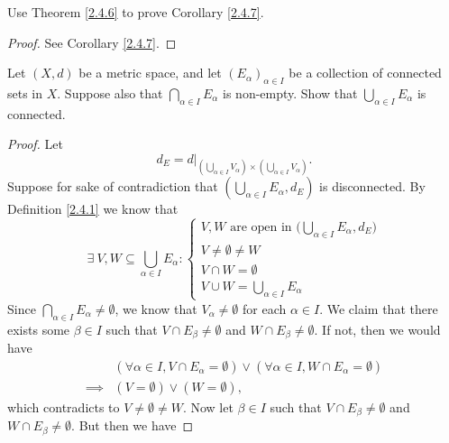 \begin{exercise}\label{ex 2.4.5}
    Use Theorem \ref{2.4.6} to prove Corollary \ref{2.4.7}.
\end{exercise}

\begin{proof}
    See Corollary \ref{2.4.7}.
\end{proof}

\begin{exercise}\label{ex 2.4.6}
    Let \((X, d)\) be a metric space, and let \((E_\alpha)_{\alpha \in I}\) be a collection of connected sets in \(X\).
    Suppose also that \(\bigcap_{\alpha \in I} E_\alpha\) is non-empty.
    Show that \(\bigcup_{\alpha \in I} E_\alpha\) is connected.
\end{exercise}

\begin{proof}
    Let
    \[
        d_E = d|_{(\bigcup_{\alpha \in I} V_\alpha) \times (\bigcup_{\alpha \in I} V_\alpha)}.
    \]
    Suppose for sake of contradiction that \((\bigcup_{\alpha \in I} E_\alpha, d_E)\) is disconnected.
    By Definition \ref{2.4.1} we know that
    \[
        \exists\ V, W \subseteq \bigcup_{\alpha \in I} E_\alpha : \begin{cases}
            V, W \text{ are open in } \bigg(\bigcup_{\alpha \in I} E_\alpha, d_E\bigg) \\
            V \neq \emptyset \neq W                                                    \\
            V \cap W = \emptyset                                                       \\
            V \cup W = \bigcup_{\alpha \in I} E_\alpha
        \end{cases}
    \]
    Since \(\bigcap_{\alpha \in I} E_\alpha \neq \emptyset\), we know that \(V_\alpha \neq \emptyset\) for each \(\alpha \in I\).
    We claim that there exists some \(\beta \in I\) such that \(V \cap E_\beta \neq \emptyset\) and \(W \cap E_\beta \neq \emptyset\).
    If not, then we would have
    \begin{align*}
                 & (\forall \alpha \in I, V \cap E_\alpha = \emptyset) \lor (\forall \alpha \in I, W \cap E_\alpha = \emptyset) \\
        \implies & (V = \emptyset) \lor (W = \emptyset),
    \end{align*}
    which contradicts to \(V \neq \emptyset \neq W\).
    Now let \(\beta \in I\) such that \(V \cap E_\beta \neq \emptyset\) and \(W \cap E_\beta \neq \emptyset\).
    But then we have

\end{proof}
